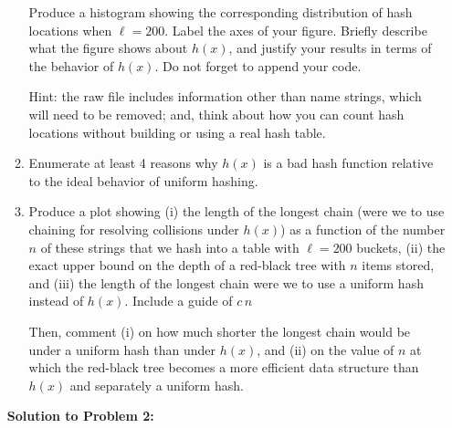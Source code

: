 \documentclass[12pt]{article}
\begin{document}
\begin{enumerate}
\begin{enumerate}
    	Produce a histogram showing the corresponding distribution of hash locations when $\ell=200$. Label the axes of your figure. Briefly describe what the figure shows about $h(x)$, and justify your results in terms of the behavior of $h(x)$. Do not forget to append your code.
    	 
    	{\footnotesize Hint: the raw file includes information other than name strings, which will need to be removed; and, think about how you can count hash locations without building or using a real hash table.}
    	
    	\item Enumerate at least 4 reasons why $h(x)$ is a bad hash function relative to the ideal behavior of uniform hashing.
    	
    	\item Produce a plot showing (i) the length of the longest chain (were we to use chaining for resolving collisions under $h(x)$) as a function of the number $n$ of these strings that we hash into a table with $\ell=200$ buckets, (ii) the exact upper bound on the depth of a red-black tree with $n$ items stored, and (iii) the length of the longest chain were we to use a uniform hash instead of $h(x)$. Include a guide of $c\,n$
    	
    	Then, comment (i) on how much shorter the longest chain would be under a uniform hash than under $h(x)$, and (ii) on the value of $n$ at which the red-black tree becomes a more efficient data structure than $h(x)$ and separately a uniform hash.
	\end{enumerate}

\pagebreak
\textbf{Solution to Problem 2:}


\end{enumerate}
\end{document}
